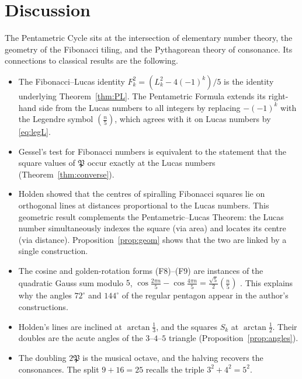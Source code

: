 \documentclass[11pt,a4paper]{article}
\newcommand{\Pent}{\mathfrak{P}}                      %
\newcommand{\leg}[1]{\left(\tfrac{#1}{5}\right)}      %
\theoremstyle{plain}
\theoremstyle{definition}
\theoremstyle{remark}
\begin{document}
\section{Discussion}\label{sec:discussion}

The Pentametric Cycle sits at the intersection of elementary number theory, the geometry of the Fibonacci tiling, and the Pythagorean theory of consonance. Its connections to classical results are the following.

\begin{itemize}[itemsep=2pt]
  \item The Fibonacci–Lucas identity $F_k^{2}=(L_k^{2}-4(-1)^{k})/5$ is the identity underlying Theorem~\ref{thm:PL}. The Pentametric Formula extends its right-hand side from the Lucas numbers to all integers by replacing $-(-1)^{k}$ with the Legendre symbol $\leg{n}$, which agrees with it on Lucas numbers by \eqref{eq:legL}.
  \item Gessel's test for Fibonacci numbers \cite{Gessel1971} is equivalent to the statement that the square values of $\Pent$ occur exactly at the Lucas numbers (Theorem~\ref{thm:converse}).
  \item Holden \cite{Holden1975} showed that the centres of spiralling Fibonacci squares lie on orthogonal lines at distances proportional to the Lucas numbers. This geometric result complements the Pentametric–Lucas Theorem: the Lucas number simultaneously indexes the square (via area) and locates its centre (via distance). Proposition~\ref{prop:geom} shows that the two are linked by a single construction.
  \item The cosine and golden-rotation forms (F8)–(F9) are instances of the quadratic Gauss sum modulo $5$, $\cos\frac{2\pi n}{5}-\cos\frac{4\pi n}{5}=\frac{\sqrt5}{2}\leg{n}$ \cite{IrelandRosen1990}. This explains why the angles $72^\circ$ and $144^\circ$ of the regular pentagon appear in the author's constructions.
  \item Holden's lines are inclined at $\arctan\frac13$, and the squares $S_k$ at $\arctan\frac12$. Their doubles are the acute angles of the $3$–$4$–$5$ triangle (Proposition~\ref{prop:angles}).
  \item The doubling $2\Pent$ is the musical octave, and the halving recovers the consonances. The split $9+16=25$ recalls the triple $3^{2}+4^{2}=5^{2}$.
\end{itemize}
\end{document}

